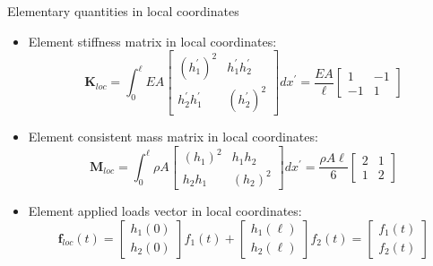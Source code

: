 \documentclass[aspectratio=169]{beamer}
\begin{document}
\begin{frame}{Elementary quantities in local coordinates}
  \begin{itemize}
    \item Element stiffness matrix in local coordinates:
          \[ \mathbf{K}_{loc} =\int_0^{\ell}  EA \begin{bmatrix} (h_1^\prime)^2 & h_1^\prime h_2^\prime \\  h_2^\prime h_1^\prime &  (h_2^\prime)^2 \end{bmatrix} dx^\prime =\frac{EA}{\ell} \begin{bmatrix} 1 & -1 \\ -1 & 1 \end{bmatrix} \]
    \item Element consistent mass matrix in local coordinates:
          \[ \mathbf{M}_{loc} =\int_0^{\ell}\rho A \begin{bmatrix} (h_1)^2 &h_1 h_2 \\  h_2 h_1 &  (h_2)^2 \end{bmatrix} dx^\prime =\frac{\rho A\ell }{6} \begin{bmatrix} 2 & 1 \\ 1 & 2 \end{bmatrix} \]
    \item Element applied loads vector in local coordinates:
          \[ \mathbf{f}_{loc}(t) =\begin{bmatrix} h_1(0) \\ h_2(0)\end{bmatrix}f_{1}(t) + \begin{bmatrix} h_1(\ell) \\ h_2(\ell)\end{bmatrix}f_{2}(t) = \begin{bmatrix} f_{1}(t) \\ f_{2}(t) \end{bmatrix} \]
  \end{itemize}
\end{frame}
\end{document}
